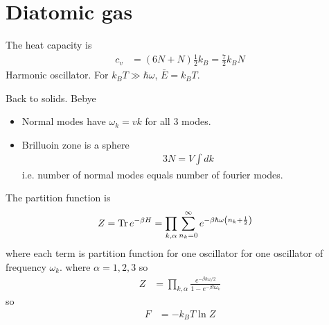 \section{Diatomic gas}
The heat capacity is
\begin{align}
    c_v &= (6N + N)\frac{1}{2}k_B = \frac{7}{2}k_B N
\end{align}
Harmonic oscillator.
For $k_B T \gg \hbar\omega$, $\bar{E} = k_B T$.

Back to solids.
Bebye
\begin{itemize}
    \item Normal modes have $\omega_k=v k$ for all 3 modes.
    \item Brilluoin zone is a sphere
        \begin{align}
            3N = V \int dk
        \end{align}
        i.e. number of normal modes equals number of fourier modes.
\end{itemize}
The partition function is
\begin{align}
    Z &= \Tr e^{-\beta H}
    =
    \prod_{k,\alpha}\sum_{n_k=0}^{\infty} e^{-\beta\hbar\omega\left( n_k +
    \frac{1}{2}
    \right)}
\end{align}
where each term is partition function for one oscillator for one oscillator of
frequency $\omega_k$.
where $\alpha = 1,2,3$
so
\begin{align}
    Z &=
    \prod_{k,\alpha}
    \frac{e^{-\beta\hbar\omega/2}}{1 - e^{-\beta\hbar\omega_k}}
\end{align}
so
\begin{align}
    F &= -k_B T\ln Z
\end{align}

